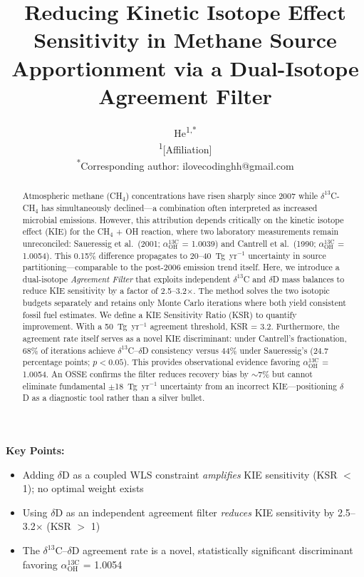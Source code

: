 \documentclass[11pt,twocolumn]{article}
\title{Reducing Kinetic Isotope Effect Sensitivity in Methane Source Apportionment via a Dual-Isotope Agreement Filter}
\author{He\textsuperscript{1,*} \\[4pt]
\textsuperscript{1}[Affiliation] \\[2pt]
\textsuperscript{*}Corresponding author: ilovecodinghh@gmail.com}
\date{}
\begin{document}
\maketitle

\begin{abstract}
Atmospheric methane (CH$_4$) concentrations have risen sharply since 2007 while $\delta^{13}$C-CH$_4$ has simultaneously declined---a combination often interpreted as increased microbial emissions. However, this attribution depends critically on the kinetic isotope effect (KIE) for the CH$_4$ + OH reaction, where two laboratory measurements remain unreconciled: Saueressig et al.\ (2001; $\alpha_{\mathrm{OH}}^{13\mathrm{C}}$ = 1.0039) and Cantrell et al.\ (1990; $\alpha_{\mathrm{OH}}^{13\mathrm{C}}$ = 1.0054). This 0.15\% difference propagates to 20--40~Tg~yr$^{-1}$ uncertainty in source partitioning---comparable to the post-2006 emission trend itself. Here, we introduce a dual-isotope \emph{Agreement Filter} that exploits independent $\delta^{13}$C and $\delta$D mass balances to reduce KIE sensitivity by a factor of 2.5--3.2$\times$. The method solves the two isotopic budgets separately and retains only Monte Carlo iterations where both yield consistent fossil fuel estimates. We define a KIE Sensitivity Ratio (KSR) to quantify improvement. With a 50~Tg~yr$^{-1}$ agreement threshold, KSR = 3.2. Furthermore, the agreement rate itself serves as a novel KIE discriminant: under Cantrell's fractionation, 68\% of iterations achieve $\delta^{13}$C--$\delta$D consistency versus 44\% under Saueressig's (24.7 percentage points; $p < 0.05$). This provides observational evidence favoring $\alpha_{\mathrm{OH}}^{13\mathrm{C}}$ = 1.0054. An OSSE confirms the filter reduces recovery bias by $\sim$7\% but cannot eliminate fundamental $\pm$18~Tg~yr$^{-1}$ uncertainty from an incorrect KIE---positioning $\delta$D as a diagnostic tool rather than a silver bullet.
\end{abstract}

\noindent\textbf{Key Points:}
\begin{itemize}
\item Adding $\delta$D as a coupled WLS constraint \emph{amplifies} KIE sensitivity (KSR $<$ 1); no optimal weight exists
\item Using $\delta$D as an independent agreement filter \emph{reduces} KIE sensitivity by 2.5--3.2$\times$ (KSR $>$ 1)
\item The $\delta^{13}$C--$\delta$D agreement rate is a novel, statistically significant discriminant favoring $\alpha_{\mathrm{OH}}^{13\mathrm{C}}$ = 1.0054
\end{itemize}
\end{document}
